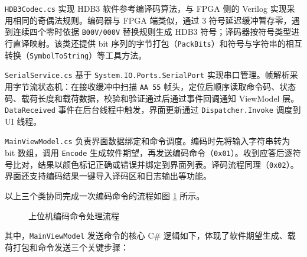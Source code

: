 \documentclass[UTF8,a4paper,12pt]{ctexart}
\begin{document}
\texttt{HDB3Codec.cs} 实现 HDB3 软件参考编译码算法，与 FPGA 侧的 Verilog 实现采用相同的奇偶法规则。编码器与 FPGA 端类似，通过 3 符号延迟缓冲暂存零，遇到连续四个零时依据 \texttt{B00V/000V} 替换规则生成 HDB3 符号；译码器按符号类型进行直译映射。该类还提供 bit 序列的字节打包（\texttt{PackBits}）和符号与字符串的相互转换（\texttt{SymbolToString}）等工具方法。

\texttt{SerialService.cs} 基于 \texttt{System.IO.Ports.SerialPort} 实现串口管理。帧解析采用字节流状态机：在接收缓冲中扫描 \texttt{AA 55} 帧头，定位后顺序读取命令码、状态码、载荷长度和载荷数据，校验和验证通过后通过事件回调通知 ViewModel 层。\texttt{DataReceived} 事件在后台线程中触发，界面更新通过 \texttt{Dispatcher.Invoke} 调度到 UI 线程。

\texttt{MainViewModel.cs} 负责界面数据绑定和命令调度。编码时先将输入字符串转为 bit 数组，调用 \texttt{Encode} 生成软件期望，再发送编码命令（\texttt{0x01}）。收到应答后逐符号比对，结果以颜色标记正确或错误并绑定到界面列表。译码流程同理（\texttt{0x02}）。界面还支持编码结果一键导入译码区和日志输出等功能。

以上三个类协同完成一次编码命令的流程如图 \ref{fig:pc_flow} 所示。

\begin{figure}[H]
  \centering
  \caption{上位机编码命令处理流程}
  \label{fig:pc_flow}
\end{figure}

其中，\texttt{MainViewModel} 发送命令的核心 C\# 逻辑如下，体现了软件期望生成、载荷打包和命令发送三个关键步骤：
\end{document}
